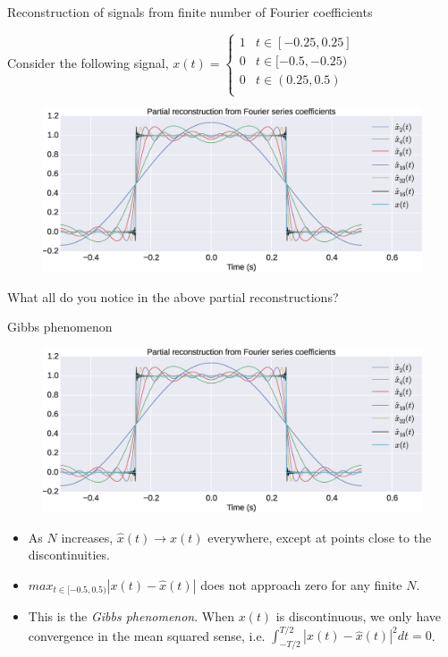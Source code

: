 \documentclass{beamer}
\begin{document}
\begin{frame}{Reconstruction of signals from finite number of Fourier coefficients}

Consider the following signal, $x(t) = \begin{cases}
1 & t \in [-0.25, 0.25] \\
0 & t \in [-0.5, -0.25) \\
0 & t \in (0.25, 0.5) \\
\end{cases}$

\begin{figure}
\includegraphics[width=\textwidth]{img/gibbs_fs.eps}
\end{figure}
\vspace{-5mm}

What all do you notice in the above partial reconstructions?

\end{frame}

\begin{frame}{Gibbs phenomenon}

\begin{figure}
\includegraphics[width=\textwidth]{img/gibbs_fs.eps}
\end{figure}
\vspace{-5mm}

\begin{itemize}
\item As $N$ increases, $\hat{x}(t) \to x(t)$ everywhere, except at points close to the discontinuities.
\item $max_{t\in[-0.5, 0.5)}\left|x(t) - \hat{x}(t)\right|$ does not approach zero for any finite $N$.
\item This is the \textit{Gibbs phenomenon}. When $x(t)$ is discontinuous, we only have convergence in the mean squared sense, i.e. $\int_{-T/2}^{T/2} \left|x(t)-\hat{x}(t)\right|^2dt = 0$.
\end{itemize}

\end{frame}
\end{document}
